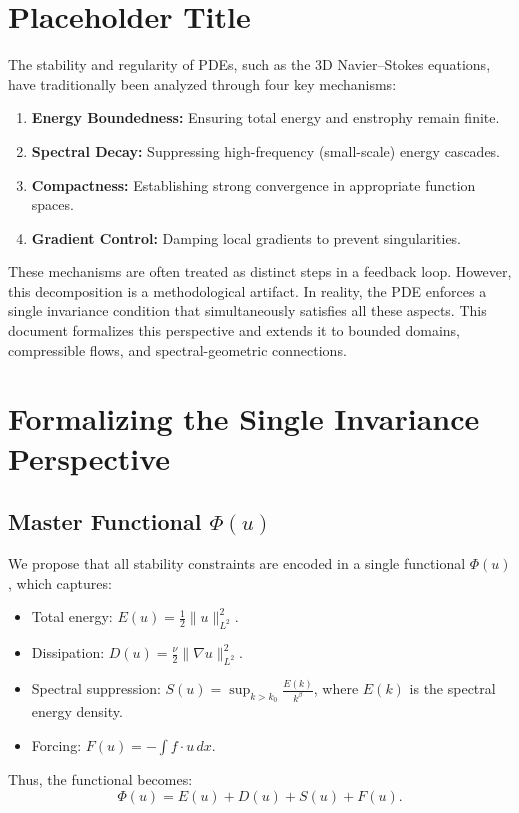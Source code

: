 \section{Placeholder Title}

The stability and regularity of PDEs, such as the 3D Navier--Stokes equations, have traditionally been analyzed through four key mechanisms:
\begin{enumerate}
    \item \textbf{Energy Boundedness:} Ensuring total energy and enstrophy remain finite.
    \item \textbf{Spectral Decay:} Suppressing high-frequency (small-scale) energy cascades.
    \item \textbf{Compactness:} Establishing strong convergence in appropriate function spaces.
    \item \textbf{Gradient Control:} Damping local gradients to prevent singularities.
\end{enumerate}
These mechanisms are often treated as distinct steps in a feedback loop. However, this decomposition is a methodological artifact. In reality, the PDE enforces a single invariance condition that simultaneously satisfies all these aspects. This document formalizes this perspective and extends it to bounded domains, compressible flows, and spectral-geometric connections.

\section{Formalizing the Single Invariance Perspective}

\subsection{Master Functional \(\Phi(u)\)}
We propose that all stability constraints are encoded in a single functional \(\Phi(u)\), which captures:
\begin{itemize}
    \item Total energy: \(E(u) = \frac{1}{2} \| u \|_{L^2}^2\).
    \item Dissipation: \(D(u) = \frac{\nu}{2} \| \nabla u \|_{L^2}^2\).
    \item Spectral suppression: \(S(u) = \sup_{k > k_0} \frac{E(k)}{k^\beta}\), where \(E(k)\) is the spectral energy density.
    \item Forcing: \(F(u) = -\int f \cdot u \, dx\).
\end{itemize}
Thus, the functional becomes:
\begin{equation}
\Phi(u) = E(u) + D(u) + S(u) + F(u).
\end{equation}

